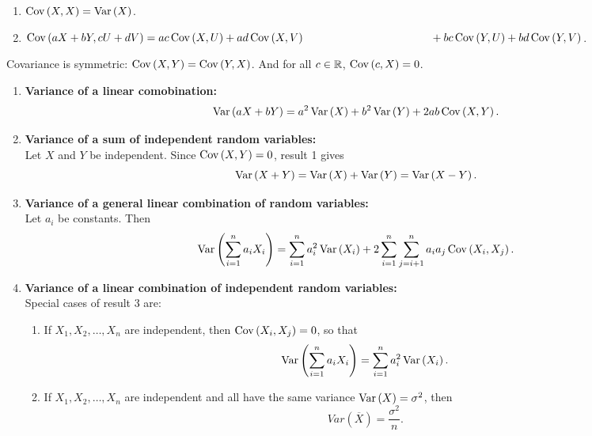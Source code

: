 \begin{theorem}
    \phantom{}
    \begin{enumerate}
        \item $\operatorname{Cov}\left({X,X}\right) = \operatorname{Var}\left({X}\right)$.
        \item $\Cov{aX+bY,cU+dV} = ac\Cov{X,U} + ad\Cov{X,V} \\ \hspace*{40mm}+ bc\Cov{Y,U} + bd\Cov{Y,V}$.
    \end{enumerate}
\end{theorem}
\begin{note}
    Covariance is symmetric: $\operatorname{Cov}\left({X,Y}\right) = \operatorname{Cov}\left({Y,X}\right)$. And for all $c\in {\mathbb{R}}$, $\operatorname{Cov}\left({c,X}\right) = 0$.
\end{note}

\begin{theorem}
    \phantom{}
    \begin{enumerate}
        \item \textbf{Variance of a linear comobination:} \vspace{-3mm}
        \[
            \operatorname{Var}\left({aX+bY}\right) = a^2\operatorname{Var}\left({X}\right) + b^2\operatorname{Var}\left({Y}\right) + 2ab\operatorname{Cov}\left({X,Y}\right).
        \]
        \item \textbf{Variance of a sum of independent random variables:} \\
        Let $X$ and $Y$ be independent. Since $\operatorname{Cov}\left({X,Y}\right) = 0$, result 1 gives \vspace{-3mm}
        \[
            \operatorname{Var}\left({X+Y}\right) = \operatorname{Var}\left({X}\right) + \operatorname{Var}\left({Y}\right) = \operatorname{Var}\left({X-Y}\right).
        \]
        \item \textbf{Variance of a general linear combination of random variables:} \\
        Let $a_i$ be constants. Then \vspace{-3mm}
        \[
            \operatorname{Var}\left({\displaystyle \sum_{i=1}^{n} a_iX_i}\right) = \displaystyle \sum_{i=1}^{n} a_i^2\operatorname{Var}\left({X_i}\right) + 2\displaystyle \sum_{i=1}^{n} \sum_{j=i+1}^{n} a_i a_j \operatorname{Cov}\left({X_i,X_j}\right). 
        \]
        \pagebreak
        \item \textbf{Variance of a linear combination of independent random variables:} \\
        Special cases of result 3 are:
        \begin{enumerate}
            \item If $X_1, X_2, \ldots, X_n$ are independent, then $\operatorname{Cov}\left({X_i,X_j}\right) = 0$, so that \vspace{-3mm}
            \[
                \operatorname{Var}\left({\displaystyle \sum_{i=1}^{n} a_iX_i}\right) = \displaystyle \sum_{i=1}^{n} a_i^2\operatorname{Var}\left({X_i}\right).
            \]
            \item If $X_1, X_2, \ldots, X_n$ are independent and all have the same variance $\operatorname{Var}\left({X}\right) = \sigma^2$, then \vspace{-3mm}
            \[
                Var{\left( \overline{X} \right)} = \frac{\sigma^2}{n}.
            \]
        \end{enumerate}
    \end{enumerate}
\end{theorem}


